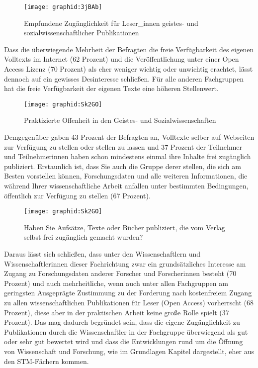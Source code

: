 \begin{figure}[h!]
\texttt{[image: graphid:3jBAb]}
\caption{Empfundene Zugänglichkeit für Leser_innen geistes- und sozialwissenschaftlicher Publikationen}
\end{figure}

Dass die überwiegende Mehrheit der Befragten die freie Verfügbarkeit des eigenen Volltexts im Internet (62 Prozent) und die Veröffentlichung unter einer Open Access Lizenz (70 Prozent) als eher weniger wichtig oder unwichtig erachtet, lässt dennoch auf ein gewisses Desinteresse schließen. Für alle anderen Fachgruppen hat die freie Verfügbarkeit der eigenen Texte eine höheren Stellenwert.

\begin{figure}[h!]
\texttt{[image: graphid:Sk2GO]}
\caption{Praktizierte Offenheit in den Geistes- und Sozialwissenschaften}
\end{figure}

Demgegenüber gaben 43 Prozent der Befragten an, Volltexte selber auf Webseiten zur Verfügung zu stellen oder stellen zu lassen und 37 Prozent der Teilnehmer und Teilnehmerinnen haben schon mindestens einmal ihre Inhalte frei zugänglich publiziert. Erstaunlich ist, dass Sie auch die Gruppe derer stellen, die sich am Besten vorstellen können, Forschungsdaten und alle weiteren Informationen, die während Ihrer wissenschaftliche Arbeit anfallen unter bestimmten Bedingungen, öffentlich zur Verfügung zu stellen (67 Prozent).

\begin{figure}[h!]
\texttt{[image: graphid:Sk2GO]}
\caption{Haben Sie Aufsätze, Texte oder Bücher publiziert, die vom Verlag selbst frei zugänglich gemacht wurden?}
\end{figure}

Daraus lässt sich schließen, dass unter den Wissenschaftlern und Wissenschaftlerinnen dieser Fachrichtung zwar ein grundsätzliches Interesse am Zugang zu Forschungsdaten anderer Forscher und Forscherinnen besteht (70 Prozent) und auch mehrheitliche, wenn auch unter allen Fachgruppen am geringsten Ausgeprägte Zustimmung zu der Forderung nach kostenfreiem Zugang zu allen wissenschaftlichen Publikationen für Leser (Open Access) vorherrscht (68 Prozent), diese aber in der praktischen Arbeit keine große Rolle spielt (37 Prozent). Das mag dadurch begründet sein, dass die eigene Zugänglichkeit zu Publikationen durch die Wissenschaftler in der Fachgruppe überwiegend als gut oder sehr gut bewertet wird und dass die Entwicklungen rund um die Öffnung von Wissenschaft und Forschung, wie im Grundlagen Kapitel dargestellt, eher aus den STM-Fächern kommen.

